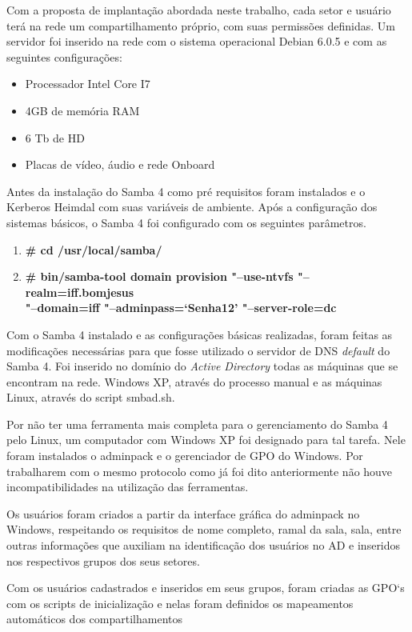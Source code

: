 Com a proposta de implantação abordada neste trabalho, cada setor e usuário terá na rede um compartilhamento próprio, com suas permissões definidas. Um servidor foi inserido na rede com o sistema operacional Debian 6.0.5 e com as seguintes configurações:

\begin{itemize}
	\item{Processador Intel Core I7\textregistered}
	\item{4GB de memória RAM}
	\item{6 Tb de HD}
	\item{Placas de vídeo, áudio e rede Onboard}
\end{itemize}

Antes da instalação do Samba 4 como pré requisitos foram instalados e o Kerberos Heimdal com suas variáveis de ambiente.
Após a configuração dos sistemas básicos, o Samba 4 foi configurado com os seguintes parâmetros.

\begin{enumerate}
	\item \textbf{\# cd /usr/local/samba/}
	\item \textbf{\# bin/samba-tool domain provision "--use-ntvfs "--realm=iff.bomjesus\\"--domain=iff  "--adminpass=`Senha12' "--server-role=dc}
\end{enumerate}

Com o Samba 4 instalado e as configurações básicas realizadas, foram feitas as modificações necessárias para que fosse utilizado o servidor de DNS \textit{default} do Samba 4. Foi inserido no domínio do \textit{Active Directory} todas as máquinas que se encontram na rede. Windows XP, através do processo manual e as máquinas Linux, através do script smbad.sh.

Por não ter uma ferramenta mais completa para o gerenciamento do Samba 4 pelo Linux, um computador com Windows XP foi designado para tal tarefa. Nele foram instalados o adminpack e o gerenciador de GPO do Windows. Por trabalharem com o mesmo protocolo como já foi dito anteriormente não houve incompatibilidades na utilização das ferramentas.

Os usuários foram criados a partir da interface gráfica do adminpack no Windows, respeitando os requisitos de nome completo, ramal da sala, sala, entre outras informações que auxiliam na identificação dos usuários no AD e inseridos nos respectivos grupos dos seus setores.

Com os usuários cadastrados e inseridos em seus grupos, foram criadas as GPO`s com os scripts de inicialização e nelas foram definidos os mapeamentos automáticos dos compartilhamentos

